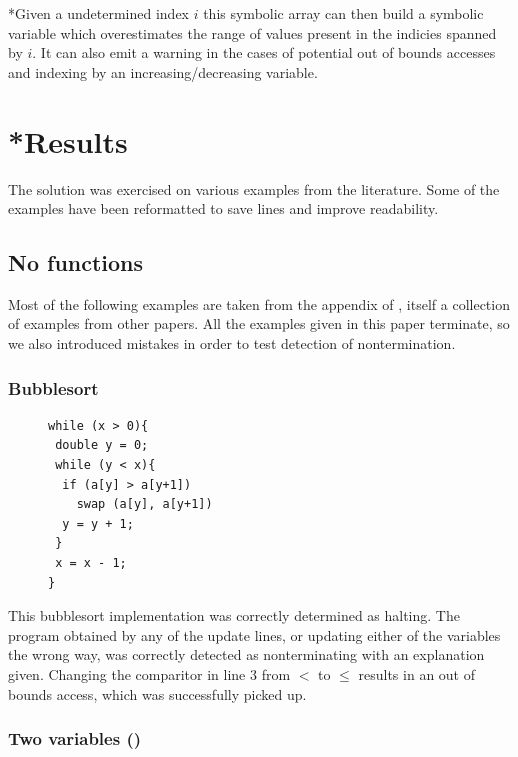 \documentclass[12pt,a4paper]{article}
\begin{document}
\begin{enumerate}
*Given a undetermined index $i$ this symbolic array can then build a symbolic variable which overestimates the range of values present in the indicies spanned by $i$. It
can also emit a warning in the cases of potential out of bounds accesses and indexing by an increasing/decreasing variable.

\newpage
\section{*Results}
The solution was exercised on various examples from the literature. Some of the examples have been reformatted to save lines and improve readability.

\subsection{No functions}
Most of the following examples are taken from the appendix of \citep{A Term Rewriting Approach to the Automated Termination Analysis of Imperative Programs}, itself a collection of examples from other papers.  All the examples given in this paper terminate, so we also introduced mistakes in order to test detection of nontermination.

\subsubsection{Bubblesort}
\begin{figure}
\centering
\begin{lstlisting}[frame=tlrb,language=myLang]
while (x > 0){
 double y = 0;
 while (y < x){
  if (a[y] > a[y+1])
    swap (a[y], a[y+1])
  y = y + 1;
 }
 x = x - 1;
}
\end{lstlisting}
\end{figure}
This bubblesort implementation was correctly determined as halting. The program obtained by any of the update lines, or updating either of the variables the wrong way, was correctly detected as nonterminating with an explanation given. Changing the comparitor in line $3$ from $<$ to $\leq$ results in an out of bounds access, which was successfully picked up.\\

\subsubsection{Two variables (\cite[A.8]{tra})}


\end{enumerate}
\end{document}
